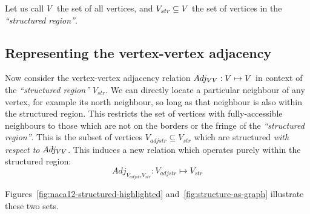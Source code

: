 

\newcommand{\strV}{V_{str}}
\newcommand{\adjstrV}{V_{adjstr}}
\newcommand{\AdjVVstr}{Adj_{\adjstrV\strV}}

Let us call $V$ the set of all vertices, and $\strV \subseteq \VertexSet$ the set of vertices in the \emph{``structured region''}.

\subsection{Representing the vertex-vertex adjacency}

Now consider the vertex-vertex adjacency relation $Adj_{VV}: V \mapsto V$ in context of the \emph{``structured region''} $\strV$. We can directly locate a particular neighbour of any vertex, for example its north neighbour, so long as that neighbour is also within the structured region. This restricts the set of vertices with fully-accessible neighbours to those which are not on the borders or the fringe of the \emph{``structured region''}. This is the subset of vertices $\adjstrV \subseteq \strV$ which are structured \emph{with respect to} $Adj_{VV}$. This induces a new relation which operates purely within the structured region:
$$\AdjVVstr: \adjstrV \mapsto \strV$$

Figures~\ref{fig:naca12-structured-highlighted} and~\ref{fig:structure-as-graph} illustrate these two sets.



